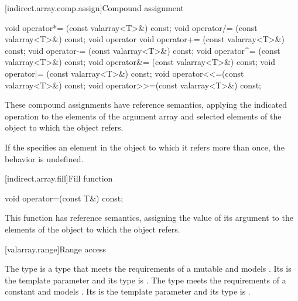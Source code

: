 [indirect.array.comp.assign]{Compound assignment}

%
%
%
%
%
%
%
%
%
%
\begin{itemdecl}
void operator*= (const valarray<T>&) const;
void operator/= (const valarray<T>&) const;
void operator%
void operator+= (const valarray<T>&) const;
void operator-= (const valarray<T>&) const;
void operator^= (const valarray<T>&) const;
void operator&= (const valarray<T>&) const;
void operator|= (const valarray<T>&) const;
void operator<<=(const valarray<T>&) const;
void operator>>=(const valarray<T>&) const;
\end{itemdecl}

\begin{itemdescr}
\pnum
These compound assignments have reference semantics, applying the indicated
operation to the elements of the argument array and selected elements of the
object to which the
object refers.

\pnum
If the
specifies an element in the
object to which it refers more than once,
the behavior is undefined.
\end{itemdescr}

[indirect.array.fill]{Fill function}

%
\begin{itemdecl}
void operator=(const T&) const;
\end{itemdecl}

\begin{itemdescr}
\pnum
This function has reference semantics, assigning the value of its argument
to the elements of the
object to which the
object refers.
\end{itemdescr}

[valarray.range]{Range access}

\pnum
The  type
is a type that meets the requirements of a mutable
and models .
Its  is the template
parameter  and its  type is .
The  type meets the requirements of a constant
and models .
Its  is the template
parameter  and its  type is .

